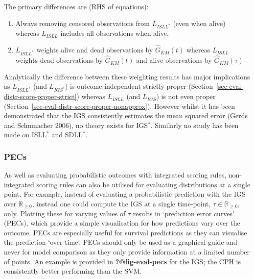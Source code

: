 \documentclass[
  letterpaper,
]{scrbook}
\providecommand{\tightlist}{%
  \setlength{\itemsep}{0pt}\setlength{\parskip}{0pt}}\usepackage{longtable,booktabs,array}
\theoremstyle{plain}
\theoremstyle{definition}
\theoremstyle{remark}
\begin{document}
The primary differences are (RHS of equations):

\begin{enumerate}
\def\labelenumi{\roman{enumi}.}
\tightlist
\item
  Always removing censored observations from \(L_{ISLL^*}\) (even when
  alive) whereas \(L_{ISLL}\) includes all observations when alive.
\item
  \(L_{ISLL^*}\) weights alive and dead observations by
  \(\hat{G}_{KM}(t)\) whereas \(L_{ISLL}\) weights dead observations by
  \(\hat{G}_{KM}(t)\) and alive observations by \(\hat{G}_{KM}(\tau)\)
\end{enumerate}

Analytically the difference between these weighting results has major
implications as \(L_{ISLL^*}\) (and \(L_{IGS^*}\)) is
outcome-independent strictly proper
(Section~\ref{sec-eval-distr-score-proper-strict}) whereas \(L_{ISLL}\)
(and \(L_{IGS}\)) is not even proper
(Section~\ref{sec-eval-distr-score-proper-nonapprox}). However whilst it
has been demonstrated that the IGS consistently estimates the mean
squared error (Gerds and Schumacher 2006), no theory exists for
IGS\(^*\). Similarly no study has been made on ISLL\(^*\) and
SDLL\(^*\).

\hypertarget{pecs}{%
\subsubsection{PECs}\label{pecs}}

As well as evaluating probabilistic outcomes with integrated scoring
rules, non-integrated scoring rules can also be utilised for evaluating
distributions at a single point. For example, instead of evaluating a
probabilistic prediction with the IGS over \(\mathbb{R}_{\geq 0}\),
instead one could compute the IGS at a single time-point,
\(\tau \in \mathbb{R}_{\geq 0}\), only. Plotting these for varying
values of \(\tau\) results in `prediction error curves' (PECs), which
provide a simple visualisation for how predictions vary over the
outcome. PECs are especially useful for survival predictions as they can
visualise the prediction `over time'. PECs should only be used as a
graphical guide and never for model comparison as they only provide
information at a limited number of points. An example is provided in
\textbf{?@fig-eval-pecs} for the IGS; the CPH is consistently better
performing than the SVM.
\end{document}
